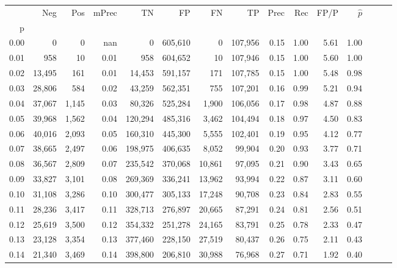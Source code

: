 \begin{tabular}{rrrrrrrrrrrrrrr}
\toprule
{} &     Neg &    Pos & mPrec &       TN &       FP &       FN &       TP &  Prec &   Rec &  FP/P & $\hat{p}$ \\
p    &         &        &       &          &          &          &          &       &       &       &           \\
\midrule
0.00 &       0 &      0 &   nan &        0 &  605,610 &        0 &  107,956 &  0.15 &  1.00 &  5.61 &      1.00 \\
0.01 &     958 &     10 &  0.01 &      958 &  604,652 &       10 &  107,946 &  0.15 &  1.00 &  5.60 &      1.00 \\
0.02 &  13,495 &    161 &  0.01 &   14,453 &  591,157 &      171 &  107,785 &  0.15 &  1.00 &  5.48 &      0.98 \\
0.03 &  28,806 &    584 &  0.02 &   43,259 &  562,351 &      755 &  107,201 &  0.16 &  0.99 &  5.21 &      0.94 \\
0.04 &  37,067 &  1,145 &  0.03 &   80,326 &  525,284 &    1,900 &  106,056 &  0.17 &  0.98 &  4.87 &      0.88 \\
0.05 &  39,968 &  1,562 &  0.04 &  120,294 &  485,316 &    3,462 &  104,494 &  0.18 &  0.97 &  4.50 &      0.83 \\
0.06 &  40,016 &  2,093 &  0.05 &  160,310 &  445,300 &    5,555 &  102,401 &  0.19 &  0.95 &  4.12 &      0.77 \\
0.07 &  38,665 &  2,497 &  0.06 &  198,975 &  406,635 &    8,052 &   99,904 &  0.20 &  0.93 &  3.77 &      0.71 \\
0.08 &  36,567 &  2,809 &  0.07 &  235,542 &  370,068 &   10,861 &   97,095 &  0.21 &  0.90 &  3.43 &      0.65 \\
0.09 &  33,827 &  3,101 &  0.08 &  269,369 &  336,241 &   13,962 &   93,994 &  0.22 &  0.87 &  3.11 &      0.60 \\
0.10 &  31,108 &  3,286 &  0.10 &  300,477 &  305,133 &   17,248 &   90,708 &  0.23 &  0.84 &  2.83 &      0.55 \\
0.11 &  28,236 &  3,417 &  0.11 &  328,713 &  276,897 &   20,665 &   87,291 &  0.24 &  0.81 &  2.56 &      0.51 \\
0.12 &  25,619 &  3,500 &  0.12 &  354,332 &  251,278 &   24,165 &   83,791 &  0.25 &  0.78 &  2.33 &      0.47 \\
0.13 &  23,128 &  3,354 &  0.13 &  377,460 &  228,150 &   27,519 &   80,437 &  0.26 &  0.75 &  2.11 &      0.43 \\
0.14 &  21,340 &  3,469 &  0.14 &  398,800 &  206,810 &   30,988 &   76,968 &  0.27 &  0.71 &  1.92 &      0.40 \\

\end{tabular}
